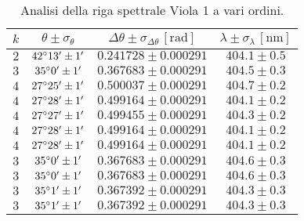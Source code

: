 \documentclass[]{article}
\begin{document}
    \begin{table}
        \centering
        \begin{tabular}{||c|c|c|c||}
            \hline
            $k$ & $\theta \pm \sigma_{\theta}$ & $\Delta\theta \pm \sigma_{\Delta\theta} \, \left[\text{rad}\right]$ & $\lambda \pm \sigma_{\lambda} \, \left[\text{nm}\right]$ \\\hline
            \hline
            $2$ & $42\degree 13' \pm 1'$ & $0.241728 \pm 0.000291$ & $404.1 \pm 0.5$ \\\hline
            $3$ & $35\degree  0' \pm 1'$ & $0.367683 \pm 0.000291$ & $404.5 \pm 0.3$ \\\hline
            $4$ & $27\degree 25' \pm 1'$ & $0.500037 \pm 0.000291$ & $404.7 \pm 0.2$ \\\hline
            $4$ & $27\degree 28' \pm 1'$ & $0.499164 \pm 0.000291$ & $404.1 \pm 0.2$ \\\hline
            $4$ & $27\degree 27' \pm 1'$ & $0.499455 \pm 0.000291$ & $404.3 \pm 0.2$ \\\hline
            $4$ & $27\degree 28' \pm 1'$ & $0.499164 \pm 0.000291$ & $404.1 \pm 0.2$ \\\hline
            $4$ & $27\degree 28' \pm 1'$ & $0.499164 \pm 0.000291$ & $404.1 \pm 0.2$ \\\hline
            $3$ & $35\degree  0' \pm 1'$ & $0.367683 \pm 0.000291$ & $404.6 \pm 0.3$ \\\hline
            $3$ & $35\degree  0' \pm 1'$ & $0.367683 \pm 0.000291$ & $404.6 \pm 0.3$ \\\hline
            $3$ & $35\degree  1' \pm 1'$ & $0.367392 \pm 0.000291$ & $404.3 \pm 0.3$ \\\hline
            $3$ & $35\degree  1' \pm 1'$ & $0.367392 \pm 0.000291$ & $404.3 \pm 0.3$ \\\hline
        \end{tabular}
        \label{viola-1}
        \caption{Analisi della riga spettrale Viola 1 a vari ordini.}
    \end{table}
\end{document}
